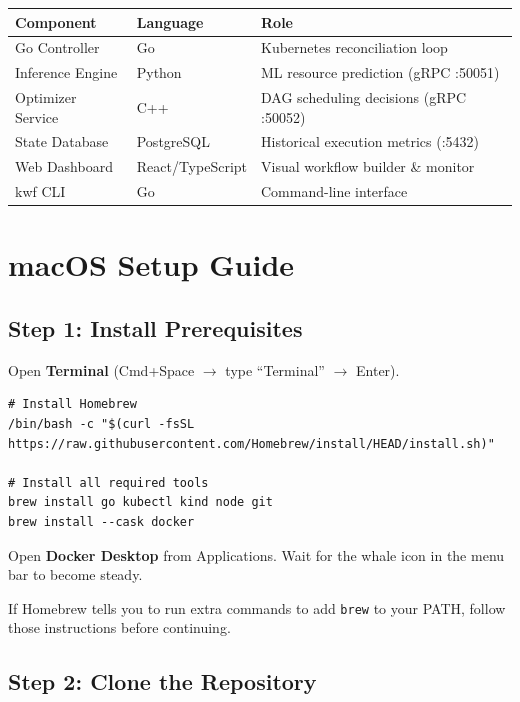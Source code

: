 \documentclass[11pt,a4paper]{article}
\begin{document}
\begin{center}
\begin{tabular}{|l|l|l|}
\hline
\textbf{Component} & \textbf{Language} & \textbf{Role} \\
\hline
Go Controller & Go & Kubernetes reconciliation loop \\
Inference Engine & Python & ML resource prediction (gRPC :50051) \\
Optimizer Service & C++ & DAG scheduling decisions (gRPC :50052) \\
State Database & PostgreSQL & Historical execution metrics (:5432) \\
Web Dashboard & React/TypeScript & Visual workflow builder \& monitor \\
kwf CLI & Go & Command-line interface \\
\hline
\end{tabular}
\end{center}

\section{macOS Setup Guide}

\subsection{Step 1: Install Prerequisites}

Open \textbf{Terminal} (Cmd+Space $\to$ type ``Terminal'' $\to$ Enter).

\begin{lstlisting}
# Install Homebrew
/bin/bash -c "$(curl -fsSL https://raw.githubusercontent.com/Homebrew/install/HEAD/install.sh)"

# Install all required tools
brew install go kubectl kind node git
brew install --cask docker
\end{lstlisting}

Open \textbf{Docker Desktop} from Applications. Wait for the whale icon in the menu bar to become steady.

\begin{tipbox}
If Homebrew tells you to run extra commands to add \texttt{brew} to your PATH, follow those instructions before continuing.
\end{tipbox}

\subsection{Step 2: Clone the Repository}
\end{document}
